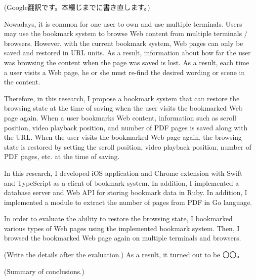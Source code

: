 \begin{eabstract}

  (Google翻訳です。本綴じまでに書き直します。)

  Nowadays, it is common for one user to own and use multiple terminals.
  Users may use the bookmark system to browse Web content from multiple terminals / browsers.
  However, with the current bookmark system, Web pages can only be saved and restored in URL units.
  As a result, information about how far the user was browsing the content when the page was saved is lost.
  As a result, each time a user visits a Web page, he or she must re-find the desired wording or scene in the content.

  Therefore, in this research, I propose a bookmark system that can restore the browsing state at the time of saving when the user visits the bookmarked Web page again.
  When a user bookmarks Web content, information such as scroll position, video playback position, and number of PDF pages is saved along with the URL.
  When the user visits the bookmarked Web page again, the browsing state is restored by setting the scroll position, video playback position, number of PDF pages, etc. at the time of saving.

  In this research, I developed iOS application and Chrome extension with Swift and TypeScript as a client of bookmark system.
  In addition, I implemented a database server and Web API for storing bookmark data in Ruby.
  In addition, I implemented a module to extract the number of pages from PDF in Go language.

  In order to evaluate the ability to restore the browsing state, I bookmarked various types of Web pages using the implemented bookmark system.
  Then, I browsed the bookmarked Web page again on multiple terminals and browsers.

  (Write the details after the evaluation.)
  As a result, it turned out to be 〇〇。

  (Summary of conclusions.)

\end{eabstract}
